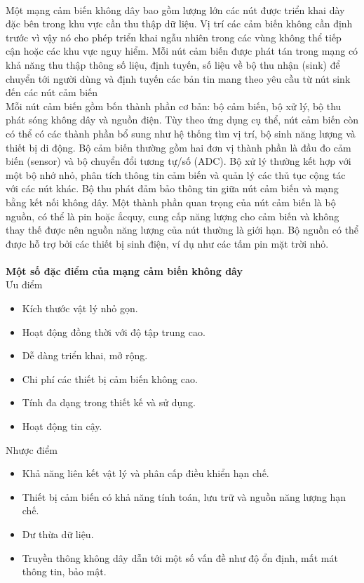 \\Một mạng cảm biến không dây bao gồm lượng lớn các nút được triển khai dày đặc bên trong khu vực cần thu thập dữ liệu. Vị trí các cảm biến không cần định trước vì vậy nó cho phép triển khai ngẫu nhiên trong các vùng không thể tiếp cận hoặc các khu vực nguy hiểm.
Mỗi nút cảm biến được phát tán trong mạng có khả năng thu thập thông số liệu, định tuyến, số liệu về bộ thu nhận (sink) để chuyển tới người dùng và định tuyến các bản tin mang theo yêu cầu từ nút sink đến các nút cảm biến
\\Mỗi nút cảm biến gồm bốn thành phần cơ bản: bộ cảm biến, bộ xử lý, bộ thu phát sóng không dây và nguồn điện. Tùy theo ứng dụng cụ thể, nút cảm biến còn có thể có các thành phần bổ sung như hệ thống tìm vị trí, bộ sinh năng lượng và thiết bị di động. Bộ cảm biến thường gồm hai đơn vị thành phần là đầu đo cảm biến (sensor) và bộ chuyển đổi tương tự/số (ADC). Bộ xử lý thường kết hợp với một bộ nhớ nhỏ, phân tích thông tin cảm biến và quản lý các thủ tục cộng tác với các nút khác. Bộ thu phát đảm bảo thông tin giữa nút cảm biến và mạng bằng kết nối không dây. Một thành phần quan trọng của nút cảm biến là bộ nguồn, có thể là pin hoặc ắcquy, cung cấp năng lượng cho cảm biến và không thay thế được nên nguồn năng lượng của nút thường là giới hạn. Bộ nguồn có thể được hỗ trợ bởi các thiết bị sinh điện, ví dụ như các tấm pin mặt trời nhỏ.
\\ \\\textbf{Một số đặc điểm của mạng cảm biến không dây}
\\Ưu điểm
\begin{itemize}
    \item Kích thước vật lý nhỏ gọn.
    \item Hoạt động đồng thời với độ tập trung cao.
    \item Dễ dàng triển khai, mở rộng.
    \item Chi phí các thiết bị cảm biến không cao.
    \item Tính đa dạng trong thiết kế và sử dụng.
    \item Hoạt động tin cậy.
\end{itemize}
Nhược điểm
\begin{itemize}
    \item Khả năng liên kết vật lý và phân cấp điều khiển hạn chế.
    \item Thiết bị cảm biến có khả năng tính toán, lưu trữ và nguồn năng lượng hạn chế.
    \item Dư thừa dữ liệu.
    \item Truyền thông không dây dẫn tới một số vấn đề như độ ổn định, mất mát thông tin, bảo mật.
\end{itemize}
